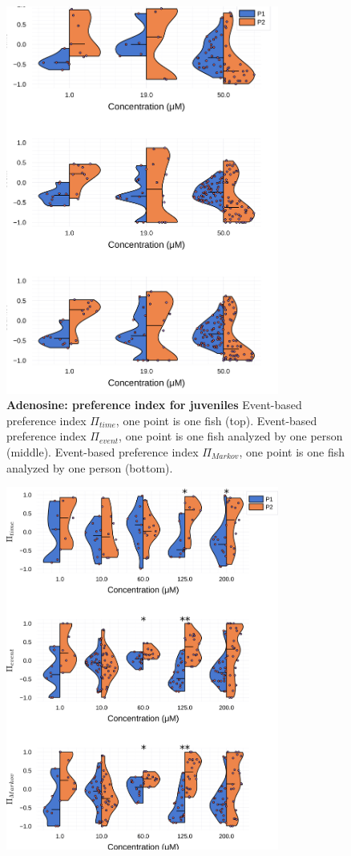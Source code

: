 \begin{appendices}
\begin{figure}[h]
      \includegraphics[width=0.8\textwidth]{part_2/assets/dist_adenosine.png}
      \caption{\textbf{Adenosine: preference index for juveniles} Event-based preference index $\Pi_{time}$, one point is one fish (top). Event-based preference index $\Pi_{event}$, one point is one fish analyzed by one person (middle). Event-based preference index $\Pi_{Markov}$, one point is one fish analyzed by one person (bottom).}
      \label{dist_adenosine}
    \end{figure}
    \begin{figure}[h]
      \centering
      \includegraphics[width=0.8\textwidth]{part_2/assets/dist_atp.png}

\end{figure}
\end{appendices}

